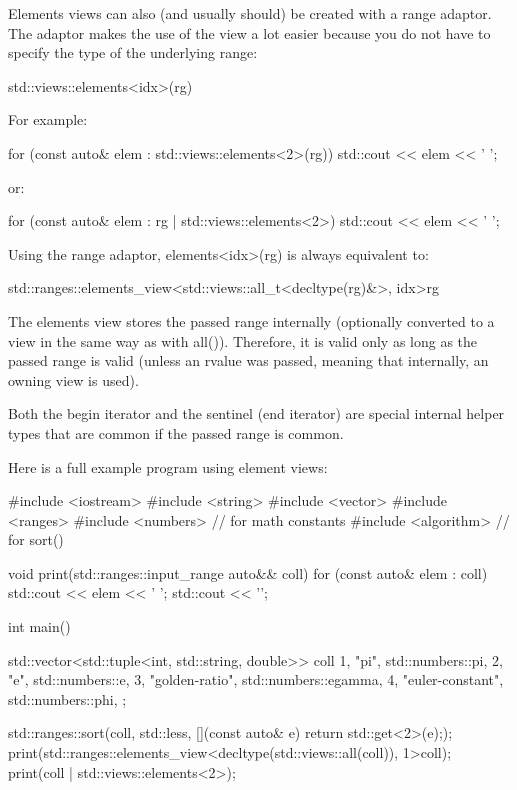 Elements views can also (and usually should) be created with a range adaptor. The adaptor makes the use of the view a lot easier because you do not have to specify the type of the underlying range:

\begin{cpp}
std::views::elements<idx>(rg)
\end{cpp}

For example:

\begin{cpp}
for (const auto& elem : std::views::elements<2>(rg)) {
	std::cout << elem << ' ';
}
\end{cpp}

or:

\begin{cpp}
for (const auto& elem : rg | std::views::elements<2>) {
	std::cout << elem << ' ';
}
\end{cpp}

Using the range adaptor, elements<idx>(rg) is always equivalent to:

\begin{cpp}
std::ranges::elements_view<std::views::all_t<decltype(rg)&>, idx>{rg}
\end{cpp}

The elements view stores the passed range internally (optionally converted to a view in the same way as with all()). Therefore, it is valid only as long as the passed range is valid (unless an rvalue was passed, meaning that internally, an owning view is used).

Both the begin iterator and the sentinel (end iterator) are special internal helper types that are common if the passed range is common.

Here is a full example program using element views:


\begin{cpp}
#include <iostream>
#include <string>
#include <vector>
#include <ranges>
#include <numbers> // for math constants
#include <algorithm> // for sort()

void print(std::ranges::input_range auto&& coll)
{
	for (const auto& elem : coll) {
		std::cout << elem << ' ';
	}
	std::cout << '\n';
}

int main()
{
	std::vector<std::tuple<int, std::string, double>> coll{
		{1, "pi", std::numbers::pi},
		{2, "e", std::numbers::e},
		{3, "golden-ratio", std::numbers::egamma},
		{4, "euler-constant", std::numbers::phi},
	};
	
	std::ranges::sort(coll, std::less{},
					  [](const auto& e) {return std::get<2>(e);});
	print(std::ranges::elements_view<decltype(std::views::all(coll)), 1>{coll});
	print(coll | std::views::elements<2>);
}
\end{cpp}

